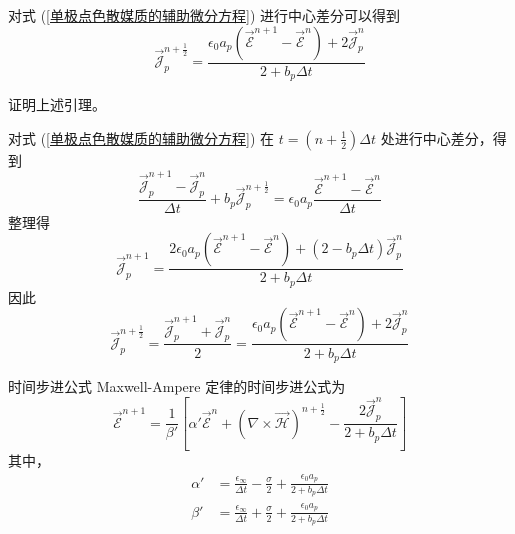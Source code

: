\begin{lemma}
    对式 (\ref{单极点色散媒质的辅助微分方程}) 进行中心差分可以得到
    \begin{equation}
        \vec{\mathscr{J}}_p^{n+\frac{1}{2}}=
        \frac{\epsilon_0 a_p
        (\vec{\mathscr{E}}^{n+1}-\vec{\mathscr{E}}^{n})
        +2\vec{\mathscr{J}}_p^{n}}{2+b_p\Delta t}
    \end{equation}
\end{lemma}

\begin{exercise}
    证明上述引理。
\end{exercise}

\begin{solution}
    对式 (\ref{单极点色散媒质的辅助微分方程}) 
    在 $t=\left(n+\frac{1}{2}\right)\Delta t$ 处进行中心差分，得到
    \begin{equation*}
        \frac{\vec{\mathscr{J}}_p^{n+1}-\vec{\mathscr{J}}_p^{n}}{\Delta t}
        +b_p \vec{\mathscr{J}}_p^{n+\frac{1}{2}}
        =\epsilon_0 a_p 
        \frac{\vec{\mathscr{E}}^{n+1}-\vec{\mathscr{E}}^{n}}{\Delta t}
    \end{equation*}
    整理得
    \begin{equation*}
        \vec{\mathscr{J}}_p^{n+1}=
        \frac{2\epsilon_0 a_p
        (\vec{\mathscr{E}}^{n+1}-\vec{\mathscr{E}}^{n})
        +(2-b_p\Delta t)\vec{\mathscr{J}}_p^{n}}{2+b_p\Delta t}
    \end{equation*}
    因此
    \begin{equation*}
        \vec{\mathscr{J}}_p^{n+\frac{1}{2}}
        = \frac{\vec{\mathscr{J}}_p^{n+1}
        +\vec{\mathscr{J}}_p^{n}}{2}
        =\frac{\epsilon_0 a_p
        (\vec{\mathscr{E}}^{n+1}-\vec{\mathscr{E}}^{n})
        +2\vec{\mathscr{J}}_p^{n}}{2+b_p\Delta t}
    \end{equation*}
\end{solution}

\begin{theorem}{时间步进公式}
    Maxwell-Ampere 定律的时间步进公式为
    \begin{equation}
        \vec{\mathscr{E}}^{n+1}=
        \frac{1}{\beta'}\left[
            \alpha' \vec{\mathscr{E}}^{n}
            +(\nabla \times \vec{\mathscr{H}})^{n+\frac{1}{2}}
            -\frac{2\vec{\mathscr{J}}_p^{n}}{2+b_p\Delta t}
        \right]
    \end{equation}
    其中，
    \begin{align}
        \alpha'&=\frac{\epsilon_{\infty}}{\Delta t}
        -\frac{\sigma}{2}
        +\frac{\epsilon_0 a_p}{2+b_p\Delta t}\\
        \beta'&=\frac{\epsilon_{\infty}}{\Delta t}
        +\frac{\sigma}{2}
        +\frac{\epsilon_0 a_p}{2+b_p\Delta t}
    \end{align}
\end{theorem}

